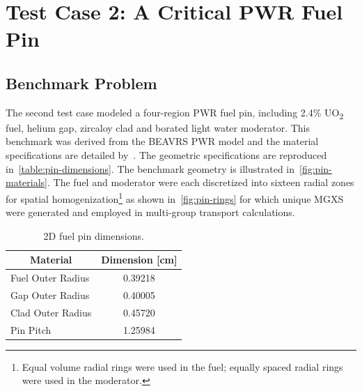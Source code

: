 \section{Test Case 2: A Critical PWR Fuel Pin}
\label{sec:test-case2}

\subsection{Benchmark Problem}
\label{subsec:benchmark-case2}

The second test case modeled a four-region PWR fuel pin, including  2.4\% UO\textsubscript{2} fuel, helium gap, zircaloy clad and borated light water moderator. This benchmark was derived from the BEAVRS PWR model and the material specifications are detailed by~\cite{horelik2013beavrs}. The geometric specifications are reproduced in~\autoref{table:pin-dimensions}. The benchmark geometry is illustrated in~\autoref{fig:pin-materials}. The fuel and moderator were each discretized into sixteen radial zones for spatial homogenization\footnote{Equal volume radial rings were used in the fuel; equally spaced radial rings were used in the moderator.} as shown in~\autoref{fig:pin-rings} for which unique MGXS were generated and employed in multi-group transport calculations.

\begin{table}[h!]
  \centering
  \caption{2D fuel pin dimensions.}
  \label{table:pin-dimensions} 
  \begin{tabular}{l c}
  \toprule
  \multicolumn{1}{c}{\bf Material} &
  {\bf Dimension [cm]} \\
  \midrule
  Fuel Outer Radius & 0.39218 \\
  Gap Outer Radius &  0.40005 \\
  Clad Outer Radius & 0.45720 \\
  Pin Pitch &         1.25984 \\
  \bottomrule
\end{tabular}
\end{table}

